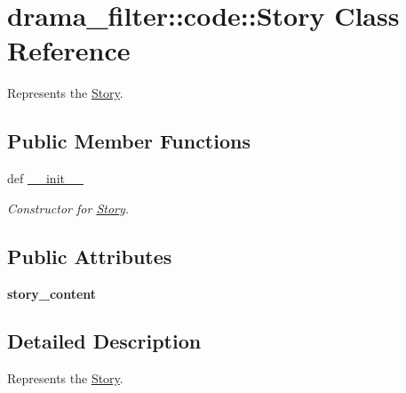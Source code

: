 \hypertarget{classdrama__filter_1_1code_1_1Story}{
\section{drama\_\-filter::code::Story Class Reference}
\label{classdrama__filter_1_1code_1_1Story}
}


Represents the \hyperlink{classdrama__filter_1_1code_1_1Story}{Story}.  


\subsection*{Public Member Functions}
\begin{DoxyCompactItemize}
\item 
def \hyperlink{classdrama__filter_1_1code_1_1Story_a98a3ac964b642c5e3bed4b282c22e485}{\_\-\_\-init\_\-\_\-}
\begin{DoxyCompactList}\small\item\em Constructor for \hyperlink{classdrama__filter_1_1code_1_1Story}{Story}. \end{DoxyCompactList}\end{DoxyCompactItemize}
\subsection*{Public Attributes}
\begin{DoxyCompactItemize}
\item 
\hypertarget{classdrama__filter_1_1code_1_1Story_ae43920bc306f92b1f9ebfd0d1a3c6574}{
{\bfseries story\_\-content}}
\label{classdrama__filter_1_1code_1_1Story_ae43920bc306f92b1f9ebfd0d1a3c6574}

\end{DoxyCompactItemize}


\subsection{Detailed Description}
Represents the \hyperlink{classdrama__filter_1_1code_1_1Story}{Story}. 

